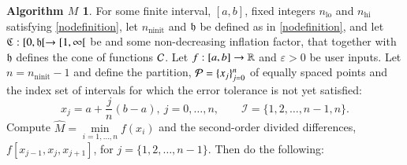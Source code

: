 \documentclass[review]{elsarticle}
\newcommand{\abstol}{\varepsilon}
\theoremstyle{definition}
\newtheorem*{algoM}{Algorithm $M$}
\newcommand{\hM}{\widehat{M}}
\DeclareMathOperator{\lo}{lo}
\DeclareMathOperator{\ninit}{ninit}
\newcommand{\minfi}{\min\limits_{i=1, \ldots,  n} f(x_i)} %
\begin{document}
\begin{algoM} \label{AlgoM}
	For some finite interval, $[a,b]$,  fixed integers $n_{\lo}$ and $n_{\text{hi}}$ satisfying \eqref{nodefinition}, let $n_{\ninit}$ and $\mathfrak{h}$ be defined as in \eqref{nodefinition}, and let  $\mathfrak{C}:[0,\mathfrak{h}[ \to [1, \infty[$ be and some non-decreasing inflation factor, that together with $\mathfrak{h}$ defines the cone of functions $\mathcal{C}$.  Let $f:[a,b] \to \mathbb{R}$ and $\abstol >0$ be
	user inputs.  Let  $n=n_{\ninit}-1$ and define the partition, $\mathcal{P} = \{x_j\}_{j=0}^n$ of  equally spaced points and the index set of intervals for which the error tolerance
	is not yet satisfied:
	$$x_j=a+\frac{j}{n}(b-a), \ j=0,\ldots,n, \qquad
	\mathcal{I} = \{1,2,\ldots,n-1,n\}.$$
	Compute $\hM= \minfi$ and the second-order divided differences, $f[x_{j-1},
	x_{j}, x_{j+1}]$, for $j = \{1,2,\ldots,n-1\}$. Then do the
	following:
	

\end{algoM}
\end{document}
